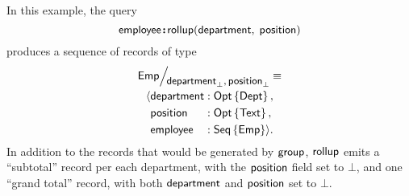 In this example, the query
\begin{equation*}
    \textup{\textsf{employee}}\!\boldsymbol{:}\!\textup{\textsf{rollup}}(\textup{\textsf{department}},\; \textup{\textsf{position}})
\end{equation*}
produces a sequence of records of type
\begin{multline*}
    \Quotient{\Emp}{\Department_{\bot},\Position_{\bot}} \equiv \\
    \begin{alignedat}{3}
        & \Tuple{&& \Department && : \Opt{\Dept}, \\
        & && \Position && : \Opt{\Text}, \\
        & && \Employee && : \Seq{\Emp}}.
    \end{alignedat}
\end{multline*}
In addition to the records that would be generated by $\textup{\textsf{group}}$, $\textup{\textsf{rollup}}$ emits
a ``subtotal'' record per each department, with the $\textup{\textsf{position}}$ field set to
$\bot$, and one ``grand total'' record, with both $\textup{\textsf{department}}$ and $\textup{\textsf{position}}$
set to $\bot$.

